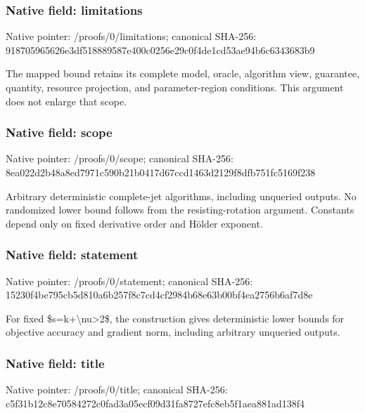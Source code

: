 \documentclass[10pt,a4paper]{article}
\begin{document}
\subsubsection{Native field: limitations}
Native pointer: /proofs/0/limitations; canonical SHA-256: 918705965626e3df518889587e400c0256e29c0f4de1cd53ae94b6c6343683b9

\begingroup\raggedright\sloppy The mapped bound retains its complete model,\allowbreak{} oracle,\allowbreak{} algorithm view,\allowbreak{} guarantee,\allowbreak{} quantity,\allowbreak{} resource projection,\allowbreak{} and parameter-region conditions. This argument does not enlarge that scope.\par\endgroup

\subsubsection{Native field: scope}
Native pointer: /proofs/0/scope; canonical SHA-256: 8ea022d2b48a8ed7971c590b21b0417d67ccd1463d2129f8dfb751fc5169f238

\begingroup\raggedright\sloppy Arbitrary deterministic complete-jet algorithms,\allowbreak{} including unqueried outputs. No randomized lower bound follows from the resisting-rotation argument. Constants depend only on fixed derivative order and H{\AtlasUnicodeText ö}\allowbreak{}lder exponent.\par\endgroup

\subsubsection{Native field: statement}
Native pointer: /proofs/0/statement; canonical SHA-256: 15230f4be795cb5d810a6b257f8c7cd4cf2984b68e63b00bf4ea2756b6af7d8e

\begingroup\raggedright\sloppy For fixed \$s=\allowbreak{}k+\textbackslash{}nu>2\$,\allowbreak{} the construction gives deterministic lower bounds for objective accuracy and gradient norm,\allowbreak{} including arbitrary unqueried outputs.\par\endgroup

\subsubsection{Native field: title}
Native pointer: /proofs/0/title; canonical SHA-256: c5f31b12c8e70584272c0fad3a05ecf09d31fa8727efc8eb5f1aea881ad138f4
\end{document}
